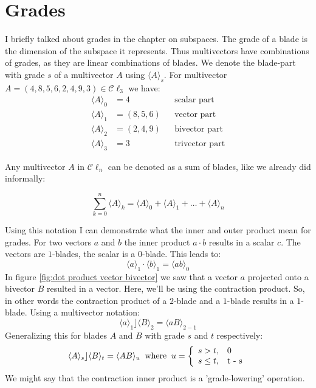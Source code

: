 \documentclass[10pt]{report}
\begin{document}
\section{Grades}

I briefly talked about grades in the chapter on subspaces. The
grade of a blade is the dimension of the subspace it represents.
Thus multivectors have combinations of grades, as they are linear
combinations of blades. We denote the blade-part with grade $s$ of
a multivector $A$ using $\langle A \rangle_{s}$. For multivector
$A = (4, 8, 5, 6, 2, 4, 9, 3) \in \mathcal{C}\ell_3$ we have:
\begin{align}
    \langle A \rangle_{0} &= 4          &&\text{scalar part} \nonumber\\
    \langle A \rangle_{1} &= (8, 5, 6)  &&\text{vector part} \nonumber\\
    \langle A \rangle_{2} &= (2, 4, 9)  &&\text{bivector part} \nonumber\\
    \langle A \rangle_{3} &= 3          &&\text{trivector part} \nonumber
\end{align}

Any multivector $A$ in $\mathcal{C}\ell_n$ can be denoted as a sum
of blades, like we already did informally:

\begin{displaymath}
    \sum_{k = 0}^{n}\langle A \rangle_{k} = \langle A \rangle_{0}
    + \langle A \rangle_{1} + \ldots + \langle A \rangle_{n}
\end{displaymath}

Using this notation I can demonstrate what the inner and outer
product mean for grades. For two vectors $a$ and $b$ the inner
product $a\cdot b$ results in a scalar $c$. The vectors are
$1$-blades, the scalar is a $0$-blade. This leads to:
\begin{displaymath}
\langle a \rangle_{1} \cdot \langle b \rangle_{1} = \langle ab
\rangle_{0}
\end{displaymath}
In figure \ref{fig:dot product vector bivector} we saw that a
vector $a$ projected onto a bivector $B$ resulted in a vector.
Here, we'll be using the contraction product. So, in other words
the contraction product of a $2$-blade and a $1$-blade results in
a $1$-blade. Using a multivector notation:
\begin{displaymath}
\langle a \rangle_{1} \rfloor \langle B \rangle_{2} = \langle aB
\rangle_{2-1}
\end{displaymath}
Generalizing this for blades $A$ and $B$ with grade $s$ and $t$
respectively:
\begin{displaymath}
\langle A \rangle_{s} \rfloor \langle B \rangle_{t} = \langle AB
\rangle_{u}\;\;\text{where}\;\; u = \left\{%
\begin{array}{ll}
    s > t, & \hbox{0} \\
    s \leq t, & \hbox{t - s} \\
\end{array}%
\right.
\end{displaymath}
We might say that the contraction inner product is a
'grade-lowering' operation.
\end{document}
